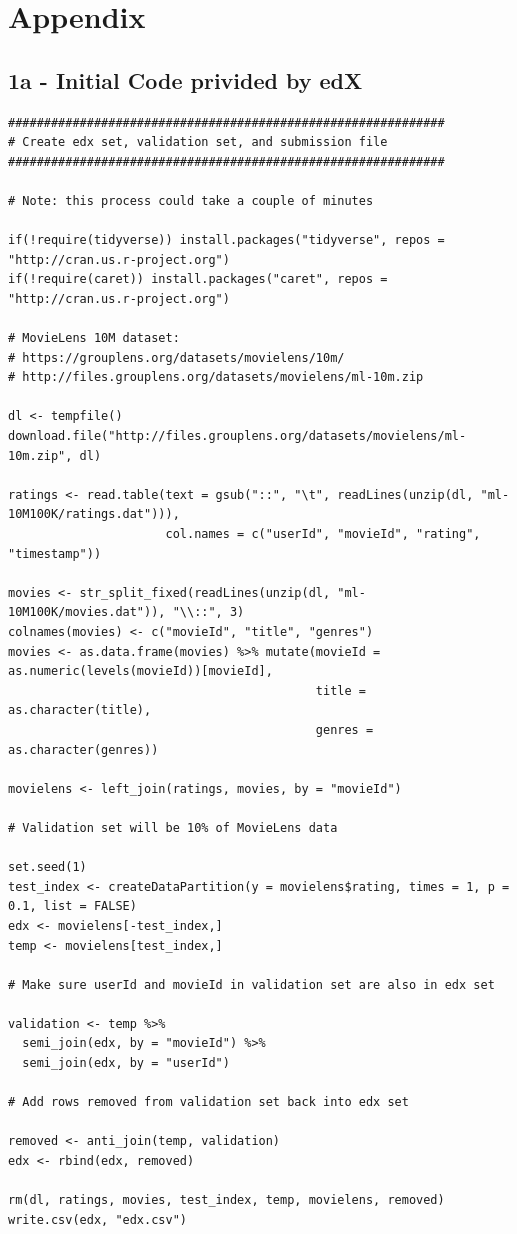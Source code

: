\documentclass[]{article}
\begin{document}
\hypertarget{appendix}{%
\section{Appendix}\label{appendix}}

\hypertarget{a---initial-code-privided-by-edx}{%
\subsection{1a - Initial Code privided by
edX}\label{a---initial-code-privided-by-edx}}

\begin{verbatim}
#############################################################
# Create edx set, validation set, and submission file
#############################################################

# Note: this process could take a couple of minutes

if(!require(tidyverse)) install.packages("tidyverse", repos = "http://cran.us.r-project.org")
if(!require(caret)) install.packages("caret", repos = "http://cran.us.r-project.org")

# MovieLens 10M dataset:
# https://grouplens.org/datasets/movielens/10m/
# http://files.grouplens.org/datasets/movielens/ml-10m.zip

dl <- tempfile()
download.file("http://files.grouplens.org/datasets/movielens/ml-10m.zip", dl)

ratings <- read.table(text = gsub("::", "\t", readLines(unzip(dl, "ml-10M100K/ratings.dat"))),
                      col.names = c("userId", "movieId", "rating", "timestamp"))

movies <- str_split_fixed(readLines(unzip(dl, "ml-10M100K/movies.dat")), "\\::", 3)
colnames(movies) <- c("movieId", "title", "genres")
movies <- as.data.frame(movies) %>% mutate(movieId = as.numeric(levels(movieId))[movieId],
                                           title = as.character(title),
                                           genres = as.character(genres))

movielens <- left_join(ratings, movies, by = "movieId")

# Validation set will be 10% of MovieLens data

set.seed(1)
test_index <- createDataPartition(y = movielens$rating, times = 1, p = 0.1, list = FALSE)
edx <- movielens[-test_index,]
temp <- movielens[test_index,]

# Make sure userId and movieId in validation set are also in edx set

validation <- temp %>% 
  semi_join(edx, by = "movieId") %>%
  semi_join(edx, by = "userId")

# Add rows removed from validation set back into edx set

removed <- anti_join(temp, validation)
edx <- rbind(edx, removed)

rm(dl, ratings, movies, test_index, temp, movielens, removed)
write.csv(edx, "edx.csv")
\end{verbatim}
\end{document}
